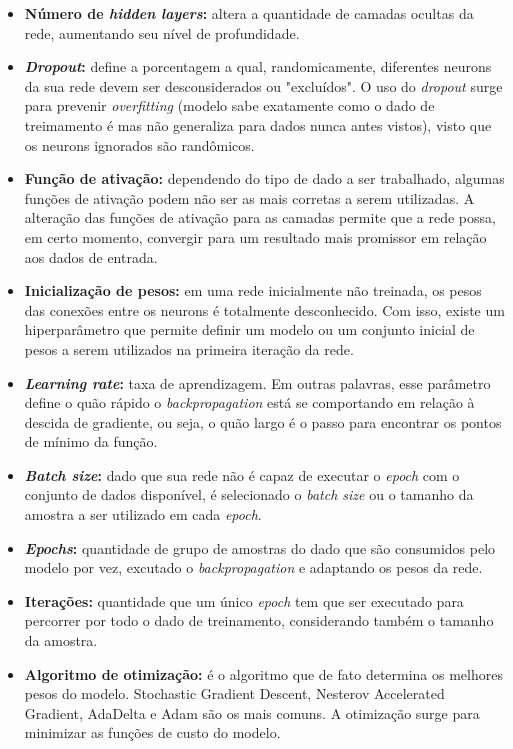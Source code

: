 \begin{itemize}
  \item \textbf{Número de \textit{hidden layers}:} altera a quantidade de camadas ocultas da rede, aumentando seu nível de profundidade.
  \item \textbf{\textit{Dropout}:} define a porcentagem a qual, randomicamente, diferentes neurons da sua rede devem ser desconsiderados ou "excluídos". O uso do \textit{dropout} surge para prevenir \textit{overfitting} (modelo sabe exatamente como o dado de treimamento é mas não generaliza para dados nunca antes vistos), visto que os neurons ignorados são randômicos.
  \item \textbf{Função de ativação:} dependendo do tipo de dado a ser trabalhado, algumas funções de ativação podem não ser as mais corretas a serem utilizadas. A alteração das funções de ativação para as camadas permite que a rede possa, em certo momento, convergir para um resultado mais promissor em relação aos dados de entrada.
  \item \textbf{Inicialização de pesos:} em uma rede inicialmente não treinada, os pesos das conexões entre os neurons é totalmente desconhecido. Com isso, existe um hiperparâmetro que permite definir um modelo ou um conjunto inicial de pesos a serem utilizados na primeira iteração da rede.
  \item \textbf{\textit{Learning rate}:} taxa de aprendizagem. Em outras palavras, esse parâmetro define o quão rápido o \textit{backpropagation} está se comportando em relação à descida de gradiente, ou seja, o quão largo é o passo para encontrar os pontos de mínimo da função.
  \item \textbf{\textit{Batch size}:} dado que sua rede não é capaz de executar o \textit{epoch} com o conjunto de dados disponível, é selecionado o \textit{batch size} ou o tamanho da amostra a ser utilizado em cada \textit{epoch}.
  \item \textbf{\textit{Epochs}:} quantidade de grupo de amostras do dado que são consumidos pelo modelo por vez, excutado o \textit{backpropagation} e adaptando os pesos da rede.
  \item \textbf{Iterações:} quantidade que um único \textit{epoch} tem que ser executado para percorrer por todo o dado de treinamento, considerando também o tamanho da amostra.
  \item \textbf{Algoritmo de otimização:} é o algoritmo que de fato determina os melhores pesos do modelo. Stochastic Gradient Descent, Nesterov Accelerated Gradient, AdaDelta e Adam são os mais comuns. A otimização surge para minimizar as funções de custo do modelo.
\end{itemize}

